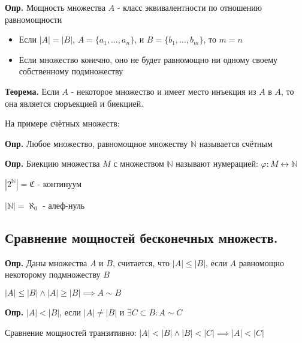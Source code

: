 \documentclass[10pt]{article}
\begin{document}
\par\textbf{Опр.} Мощность множества $A$ - класс эквивалентности по отношению равномощности
\begin{itemize}
    \item Если $|A| = |B|$,  $A = \{ a_{1}, \dots, a_{n}\}$, и $B = \{ b_{1}, \dots, b_{m}\}$, то $m = n$
    \item Если множество конечно, оно не будет равномощно ни одному своему собственному подмножеству
\end{itemize}

\par\textbf{Теорема.} Если $A$ - некоторое множество и имеет место инъекция из $A$ в $A$, то она является сюръекцией и биекцией.
\par На примере счётных множеств:
\par\textbf{Опр.} Любое множество, равномощное множеству $\mathbb{N}$ называется счётным
\par\textbf{Опр.} Биекцию множества $M$ с множеством $\mathbb{N}$ называют нумерацией: $\varphi: M \leftrightarrow \mathbb{N}$

\par $|2^{\mathbb{N}}| = \mathfrak{C}$ - континуум
\par $|\mathbb{N}| = \aleph_{0}$ - алеф-нуль

\subsection*{Сравнение мощностей бесконечных множеств.}
\par\textbf{Опр.} Даны множества $A$ и $B$, считается, что $|A| \leq |B|$, если $A$ равномощно некоторому подмножеству $B$
\par $|A| \leq |B| \land |A| \geq |B| \implies A \sim B$
\par\textbf{Опр.} $|A| < |B|$, если $|A| \neq |B|$ и $\exists C \subset B: A \sim C$
\par Сравнение мощностей транзитивно: $|A| < |B| \land |B| < |C| \implies |A| < |C|$
\end{document}

